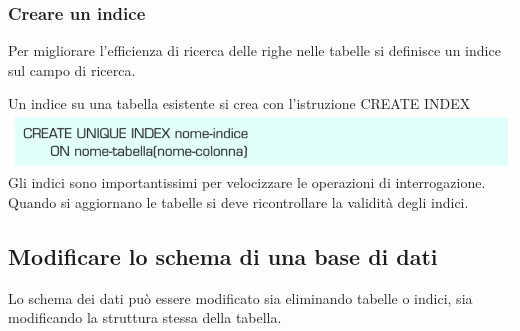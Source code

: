 \documentclass{article}
\begin{document}
    \subsubsection{Creare un indice}
    Per migliorare l'efficienza di ricerca delle righe nelle tabelle si definisce un indice sul campo di ricerca.
    
    Un indice su una tabella esistente si crea con l'istruzione CREATE INDEX\\
    \includegraphics[scale=0.9]{index.PNG}\\
    Gli indici sono importantissimi per velocizzare le operazioni di interrogazione. Quando si aggiornano le tabelle si deve ricontrollare la validità degli indici.
    \subsection{Modificare lo schema di una base di dati}
    Lo schema dei dati può essere modificato sia eliminando tabelle o indici, sia modificando la struttura stessa della tabella.\\
\end{document}
